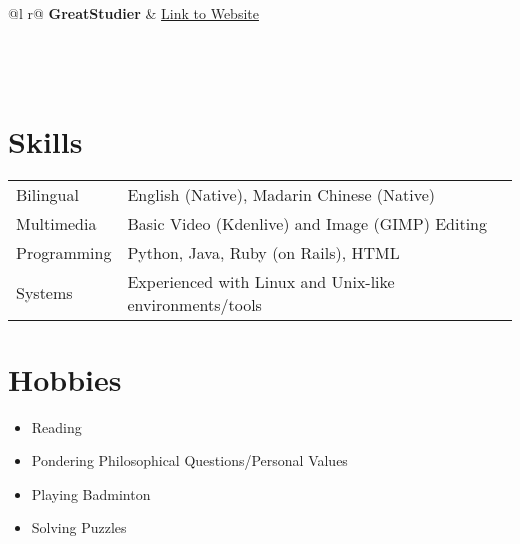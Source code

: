 \documentclass[letter, 12pt]{article}
\begin{document}
\begin{tabularx}{\linewidth}{ @{}l r@{} }
    \textbf{GreatStudier} & \hfill \href{https://github.com/greatericontop/GreatStudier}{Link to Website} \\[3.75pt]
     \\
     \\
     \\
\end{tabularx}

\section{Skills}
\begin{tabularx}{\linewidth}{@{}l X@{}}
    Bilingual &  English (Native), Madarin Chinese (Native) \\
    Multimedia & Basic Video (Kdenlive) and Image (GIMP) Editing \\
    Programming & Python, Java, Ruby (on Rails), HTML \\
    Systems & Experienced with Linux and Unix-like environments/tools \\
\end{tabularx}

\section{Hobbies}
\begin{itemize}
    \item Reading
    \item Pondering Philosophical Questions/Personal Values
    \item Playing Badminton
    \item Solving Puzzles
\end{itemize}

\vfill
{}
\end{document}

